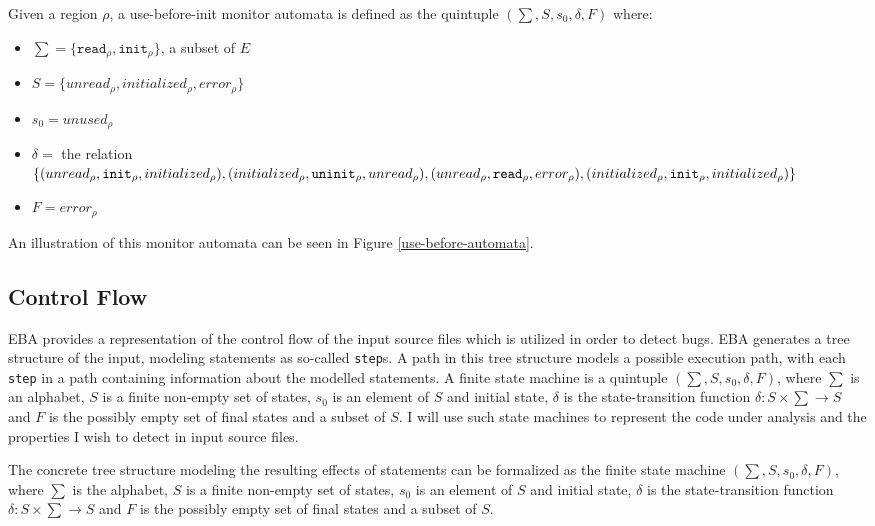 Given a region $\rho$, a use-before-init monitor automata is defined as the quintuple $(\sum, S, s_0, \delta, F)$ where: 

\begin{itemize}
    \item $\sum = \{\texttt{read}_\rho, \texttt{init}_\rho\}$, a subset of $E$
    \item $S = \{ unread_\rho, initialized_\rho, error_\rho \}$
    \item $s_0 = unused_\rho$ 
    \item $\delta =$ the relation $\{(unread_\rho, \texttt{init}_\rho, initialized_\rho), (initialized_\rho, \texttt{uninit}_\rho, unread_\rho), \\
    (unread_\rho, \texttt{read}_\rho, error_\rho), (initialized_\rho, \texttt{init}_\rho, initialized_\rho)\}$ 
    \item $F = error_\rho$  
\end{itemize}

An illustration of this monitor automata can be seen in Figure \ref{use-before-automata}. 

\subsection{Control Flow}

EBA provides a representation of the control flow of the input source files which is utilized in order to detect bugs. EBA generates a tree structure of the input, modeling statements as so-called \texttt{step}s. A path in this tree structure models a possible execution path, with each \texttt{step} in a path containing information about the modelled statements. A finite state machine is a quintuple $(\sum, S, s_0, \delta, F)$, where $\sum$ is an alphabet, $S$ is a finite non-empty set of states, $s_0$ is an element of $S$ and initial state, $\delta$ is the state-transition function $\delta: S \times \sum \rightarrow S$ and $F$ is the possibly empty set of final states and a subset of $S$. I will use such state machines to represent the code under analysis and the properties I wish to detect in input source files. 

\newpar The concrete tree structure modeling the resulting effects of statements can be formalized as the finite state machine $(\sum, S, s_0, \delta, F)$, where $\sum$ is the alphabet, $S$ is a finite non-empty set of states, $s_0$ is an element of $S$ and initial state, $\delta$ is the state-transition function $\delta: S \times \sum \rightarrow S$ and $F$ is the possibly empty set of final states and a subset of $S$. 

